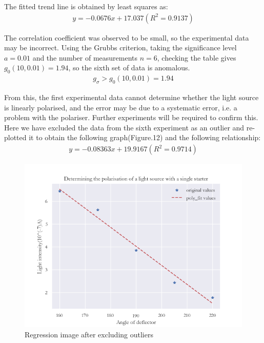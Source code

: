 \documentclass[UTF8]{article}
\begin{document}
    The fitted trend line is obtained by least squares as:
   \begin{eqnarray}y= -0.0676 x + 17.037\left ( R^{2}= 0.9137 \right ) \end{eqnarray}
    
    The correlation coefficient was observed to be small, so the experimental data may be incorrect. Using the Grubbs criterion, taking the significance level $a=0.01 $ and the number of measurements $n = 6$, checking the table gives $ g_{0} \left ( 10,0.01 \right ) =1.94$, so the sixth set of data is anomalous.
    \begin{eqnarray}g_{\sigma } > g_{0} \left ( 10,0.01 \right ) =1.94 \end{eqnarray}
    
    From this, the first experimental data cannot determine whether the light source is linearly polarised, and the error may be due to a systematic error, i.e. a problem with the polariser. Further experiments will be required to confirm this. Here we have excluded the data from the sixth experiment as an outlier and re-plotted it to obtain the following graph(Figure.12) and the following relationship:
     \begin{eqnarray}y= -0.08363 x + 19.9167\left ( R^{2}= 0.9714 \right ) \end{eqnarray}
    \begin{figure}[h]
    	\centering
    	\includegraphics[clip,scale=0.7,trim={0 0 0 0}]{figure/fig13.png}
    	\caption{Regression image after excluding outliers}
    	\label{figure.12}
    \end{figure}
\end{document}
